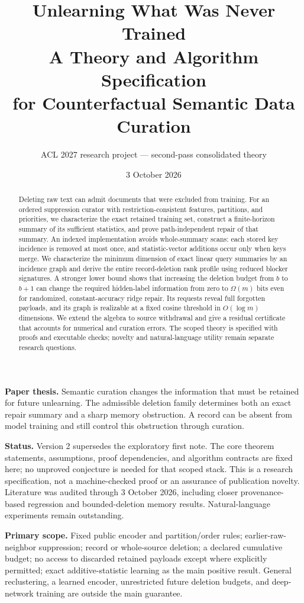 \documentclass[11pt,a4paper]{article}
\title{\color{ink}\textbf{Unlearning What Was Never Trained}\\[5pt]\Large A Theory and Algorithm Specification\\for Counterfactual Semantic Data Curation}
\author{ACL 2027 research project --- second-pass consolidated theory}
\date{3 October 2026}
\theoremstyle{definition}\newtheorem{definition}[theorem]{Definition}
\begin{document}
\maketitle
\begin{abstract}
Deleting raw text can admit documents that were excluded from training. For an ordered suppression curator with restriction-consistent features, partitions, and priorities, we characterize the exact retained training set, construct a finite-horizon summary of its sufficient statistics, and prove path-independent repair of that summary. An indexed implementation avoids whole-summary scans: each stored key incidence is removed at most once, and statistic-vector additions occur only when keys merge. We characterize the minimum dimension of exact linear query summaries by an incidence graph and derive the entire record-deletion rank profile using reduced blocker signatures. A stronger lower bound shows that increasing the deletion budget from $b$ to $b+1$ can change the required hidden-label information from zero to $\Omega(m)$ bits even for randomized, constant-accuracy ridge repair. Its requests reveal full forgotten payloads, and its graph is realizable at a fixed cosine threshold in $O(\log m)$ dimensions. We extend the algebra to source withdrawal and give a residual certificate that accounts for numerical and curation errors. The scoped theory is specified with proofs and executable checks; novelty and natural-language utility remain separate research questions.
\end{abstract}

\textbf{Paper thesis.} Semantic curation changes the information that must be retained for future unlearning. The admissible deletion family determines both an exact repair summary and a sharp memory obstruction. A record can be absent from model training and still control this obstruction through curation.

\textbf{Status.} Version 2 supersedes the exploratory first note. The core theorem statements, assumptions, proof dependencies, and algorithm contracts are fixed here; no unproved conjecture is needed for that scoped stack. This is a research specification, not a machine-checked proof or an assurance of publication novelty. Literature was audited through 3 October 2026, including closer provenance-based regression and bounded-deletion memory results. Natural-language experiments remain outstanding.

\textbf{Primary scope.} Fixed public encoder and partition/order rules; earlier-raw-neighbor suppression; record or whole-source deletion; a declared cumulative budget; no access to discarded retained payloads except where explicitly permitted; exact additive-statistic learning as the main positive result. General reclustering, a learned encoder, unrestricted future deletion budgets, and deep-network training are outside the main guarantee.
\end{document}
